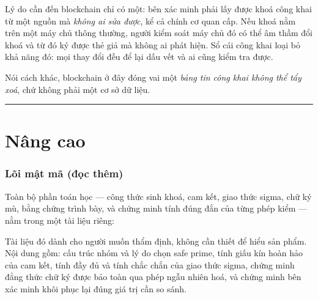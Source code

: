 \documentclass[a4paper,11pt]{article}
\begin{document}
Lý do cần đến blockchain chỉ có một: bên xác minh phải lấy được khoá công khai từ một nguồn
mà \emph{không ai sửa được}, kể cả chính cơ quan cấp. Nếu khoá nằm trên một máy chủ thông
thường, người kiểm soát máy chủ đó có thể âm thầm đổi khoá và từ đó ký được thẻ giả mà
không ai phát hiện. Sổ cái công khai loại bỏ khả năng đó: mọi thay đổi đều để lại dấu vết
và ai cũng kiểm tra được.

Nói cách khác, blockchain ở đây đóng vai một \emph{bảng tin công khai không thể tẩy xoá},
chứ không phải một cơ sở dữ liệu.

\vspace{4mm}
\hrule
\vspace{6mm}

\part*{\sffamily Nâng cao}

\section{Lõi mật mã (đọc thêm)}
\label{sec:crypto}

Toàn bộ phần toán học --- công thức sinh khoá, cam kết, giao thức sigma, chữ ký mù, bằng
chứng trình bày, và chứng minh tính đúng đắn của từng phép kiểm --- nằm trong một tài liệu
riêng:

\begin{center}
\end{center}

\noindent Tài liệu đó dành cho người muốn thẩm định, không cần thiết để hiểu sản phẩm. Nội
dung gồm: cấu trúc nhóm và lý do chọn safe prime, tính giấu kín hoàn hảo của cam kết, tính
đầy đủ và tính chắc chắn của giao thức sigma, chứng minh đẳng thức chữ ký được bảo toàn qua
phép ngẫu nhiên hoá, và chứng minh bên xác minh khôi phục lại đúng giá trị cần so sánh.
\end{document}
